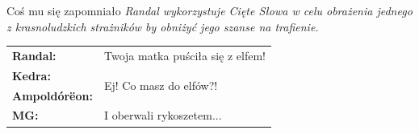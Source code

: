 \documentclass[10pt,twoside,twocolumn]{book}
\begin{document}
\begin{rpg-quotebox}{Coś mu się zapomniało}
   \textit{Randal wykorzystuje Cięte Słowa w celu obrażenia jednego z krasnoludzkich strażników by obniżyć jego szanse na trafienie.}\\

   \begin{tabularx}{\columnwidth}{lX}
      \textbf{Randal:} & Twoja matka puściła się z elfem!\\
      \textbf{Kedra:} & \multirow{2}{*}{Ej! Co masz do elfów?!}\\
      \textbf{Ampoldórëon:} & \\
      \textbf{MG:} & I oberwali rykoszetem...\\
   \end{tabularx}
\end{rpg-quotebox}
\end{document}
